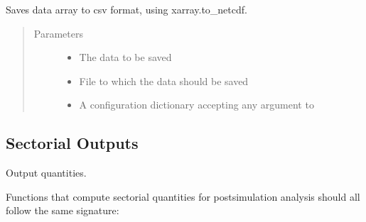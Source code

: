 \documentclass[letterpaper,10pt,english]{sphinxmanual}
\begin{document}
\begin{fulllineitems}
\label{\detokenize{api:muse.outputs.sinks.to_netcdf}}
Saves data array to csv format, using xarray.to\_netcdf.
\begin{quote}\begin{description}
\item[{Parameters}] \leavevmode\begin{itemize}
\item {} 
 \textendash{} The data to be saved

\item {} 
 \textendash{} File to which the data should be saved

\item {} 
 \textendash{} A configuration dictionary accepting any argument to 

\end{itemize}

\end{description}\end{quote}

\end{fulllineitems}



\subsection{Sectorial Outputs}
\label{\detokenize{api:module-muse.outputs.sector}}\label{\detokenize{api:sectorial-outputs}}
Output quantities.

Functions that compute sectorial quantities for post\sphinxhyphen{}simulation analysis should all
follow the same signature:

\begin{sphinxVerbatim}[commandchars=\\\{\}]
 
     
     
     
  \PYG{p}{[} \PYG{p}{]}
\end{sphinxVerbatim}
\end{document}
